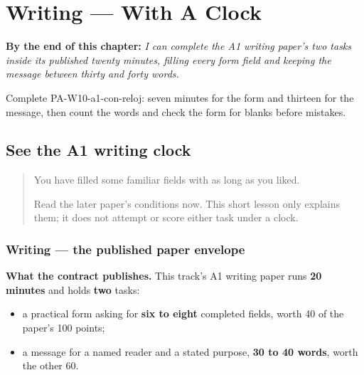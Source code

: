 
\chapter{Writing --- With A Clock}
\label{ch:pa-ghadi-naal}

\begin{chapteropening}
\textbf{By the end of this chapter:} \emph{I can complete the A1 writing paper's two tasks inside its published twenty minutes, filling every form field and keeping the message between thirty and forty words.}

Complete PA-W10-a1-con-reloj: seven minutes for the form and thirteen for the message, then count the words and check the form for blanks before mistakes.
\end{chapteropening}

\section[(timed)]{See the A1 writing clock}

\label{lesson:PA-W10-a1-con-reloj}



\begin{quote}
You have filled some familiar fields with as long as you liked.

Read the later paper's conditions now. This short lesson only explains them; it does not attempt or score either task under a clock.
\end{quote}

\subsection*{Writing — the published paper envelope}
\textbf{What the contract publishes.} This track's A1 writing paper runs \textbf{20 minutes} and holds \textbf{two} tasks:

\begin{itemize}
\raggedright
  \item a practical form asking for \textbf{six to eight} completed fields, worth 40 of the paper's 100 points;
  \item a message for a named reader and a stated purpose, \textbf{30 to 40 words}, worth the other 60.
\end{itemize}

